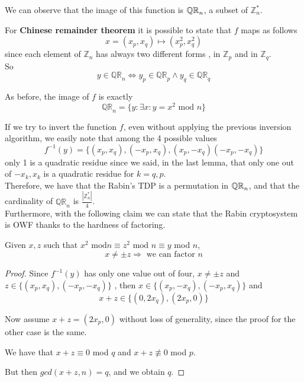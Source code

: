 We can observe that the image of this function is $\QR[n]$, a subset of $\mathbb{Z}^{*}_{n} $.

For \textbf{Chinese remainder theorem} it is possible to state that $f$ maps
as follows
\[
    x= (x_{p}, x_{q}) \mapsto (x^{2}_{p}, x^{2}_{q})
\]
since each element of $ \mathbb{Z}_n$ has always two different forms , in $
\mathbb{Z}_{p} $ and in $ \mathbb{Z}_{q} $.\\

So
\[
y \in  \mathbb{QR}_{n} \Leftrightarrow y_{p} \in \mathbb{QR}_{p} \wedge y_{q} \in
\mathbb{QR}_{q} 
\]

As before, the image of $f$ is exactly
\[
    \mathbb{QR}_{n} = \{ y: \exists x : y=x^{2} \text{ mod } n\}
\]

If we try to invert the function $f$, even without applying the previous
inversion algorithm, we easily note that among the 4 possible values
\[
    f^{-1}(y)=\{ (x_{p}, x_{q}),(-x_{p}, x_{q}),(x_{p},- x_{q})(-x_{p},- x_{q})\}
\]\label{les15:outoffour}
only 1 is a quadratic residue since we said, in the
last lemma, that only one out of
$-x_{k}, x_{k}$ is a quadratic residue for $k=q,p$.\\

Therefore, we have that the Rabin's TDP is a permutation in $\QR[n]$, and that the
cardinality of $ \mathbb{QR}_{n} $ is $\frac{|\mathbb{Z}^{*}_{n} |}{4}$.\\

Furthermore, with the following claim we can state that the Rabin cryptosystem
is OWF thanks to the hardness of factoring.

\begin{claim}
    Given $x, z$ such that $x^{2}\text{ mod} n \equiv z^{2} \text{ mod } n
    \equiv y$ mod $n$,
\[
    x\not= \pm z \Rightarrow \text{ we can factor } n
\]
\end{claim}
\begin{proof}
    Since $f^{-1}(y)$ has only one value out of four, $x\neq \pm z$ and
    $z\in \{(x_{p},x_{q}),(-x_{p},-x_{q})\}$ , then
    $x \in \{(x_{p},-x_{q}),(-x_{p},x_{q})\}$ and 
    \[
        x + z \in \{(0,2x_{q}), (2x_{p}, 0)\}
    \]

    Now assume $x + z = (2x_{p}, 0)$ without loss of generality, since the proof for the other case is the same.

    We have that $x+z \equiv 0$ mod $q$ and $x+z \not\equiv 0 $ mod $p$.

    But then $gcd( x+z , n)=q$, and we obtain $q$.
\end{proof}

